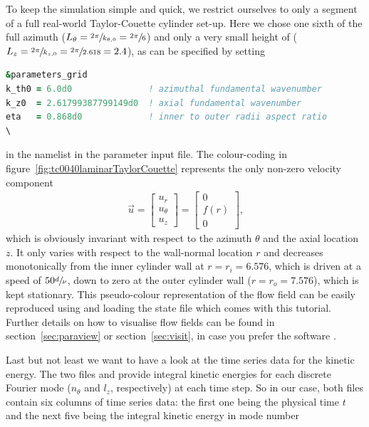 \documentclass[a4paper, 11pt, DIV=11]{scrartcl}
\begin{document}
To keep the simulation simple and quick, we restrict ourselves to only a segment of
a full real-world Taylor-Couette cylinder set-up. Here we chose one sixth of the
full azimuth ($L_{\theta}=\sfrac{2\pi}{k_{\theta,0}}=\sfrac{2\pi}{6}$) and only a
very small height of ($L_{z}=\sfrac{2\pi}{k_{z,0}}=\sfrac{2\pi}{2.618}=\num{2.4}$),
as can be specified by setting
\begin{lstlisting}[language=Fortran]
&parameters_grid
k_th0 = 6.0d0               ! azimuthal fundamental wavenumber
k_z0  = 2.61799387799149d0  ! axial fundamental wavenumber
eta   = 0.868d0             ! inner to outer radii aspect ratio
\
\end{lstlisting}
in the namelist  in the parameter input file.
The colour-coding in figure~\ref{fig:tc0040laminarTaylorCouette} represents
the only non-zero velocity component
\begin{align}
\vec{u}=
\begin{bmatrix}
u_{r}\\ u_{\theta}\\u_{z}
\end{bmatrix}
=
\begin{bmatrix}
0\\ f(r)\\0
\end{bmatrix}
\text{,} 
\end{align}
which is obviously invariant with respect to the azimuth $\theta$ and the axial
location $z$. It only varies with respect to the wall-normal location $r$ and
decreases monotonically from the inner cylinder wall at $r=r_{i}=\num{6.576}$,
which is driven at a speed of $\num{50}\sfrac{d}{\nu}$, down to zero at the outer
cylinder wall ($r=r_{o}=\num{7.576}$), which is kept stationary. This pseudo-colour
representation of the flow field can be easily reproduced using  \paraview
and loading the state file \code{la\-mi\-nar\-Tay\-lor\-Cou\-ette.pvsm} which comes with this
tutorial. Further details on how to visualise flow fields can be found in
section~\ref{sec:paraview} or section~\ref{sec:visit}, in case you prefer the software
\visit.
\par
Last but not least we want to have a look at the time series data for the
kinetic energy. The two files \code{ke\_th} and \code{ke\_z} provide integral
kinetic energies for each discrete Fourier mode ($n_{\theta}$ and $l_{z}$,
respectively) at each time step. So in our case, both files contain six
columns of time series data: the  first one being the physical time $t$ and
the next five being the integral kinetic energy in mode number
\end{document}
